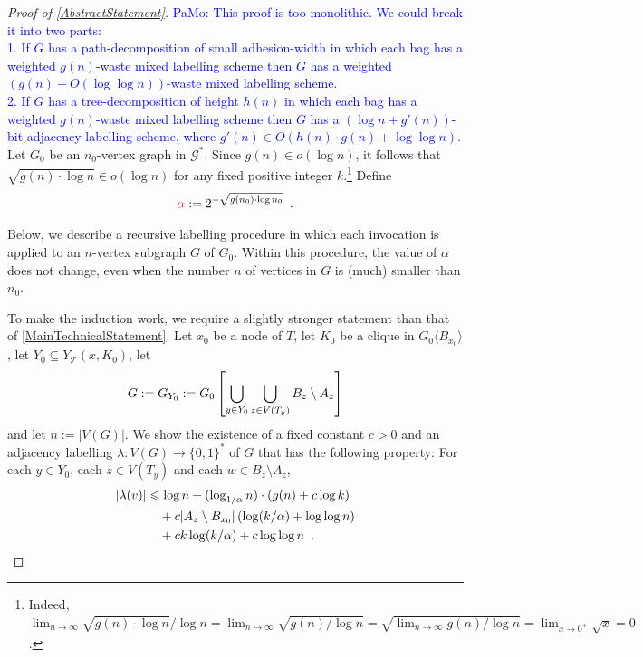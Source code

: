 \documentclass{patmorin}
\makeatletter
\newcommand{\torso}[2]{{#1}\langle{#2}\rangle}
\renewcommand{\le}{\leqslant}
\newcommand{\pat}[1]{\textcolor{Blue}{PaMo: #1}}
\def\mathcolor#1#{\@mathcolor{#1}}
\def\@mathcolor#1#2#3{%
  \protect\leavevmode
  \begingroup
    \color#1{#2}#3%
  \endgroup
}
\newcommand{\mathdefin}[1]{\mathcolor{brightmaroon}{#1}}
\makeatother
\begin{document}
  \begin{proof}[Proof of \cref{AbstractStatement}]
    \pat{This proof is too monolithic.  We could break it into two parts:\\[2ex]
    1. If $G$ has a path-decomposition of small adhesion-width in which each bag has a weighted $g(n)$-waste mixed labelling scheme then $G$ has a weighted $(g(n)+O(\log\log n))$-waste mixed labelling scheme.\\[2ex]
    2. If $G$ has a tree-decomposition of height $h(n)$ in which each bag has a weighted $g(n)$-waste mixed labelling scheme then $G$ has a $(\log n + g'(n))$-bit adjacency labelling scheme, where $g'(n)\in O(h(n)\cdot g(n)+\log\log n)$. \\[1ex]
    }
    Let $G_0$ be an $n_0$-vertex graph in $\mathcal{G}^*$.
    Since $g(n)\in o(\log n)$, it follows that $\sqrt{g(n)\cdot\log n}\in o(\log n)$ for any fixed positive integer $k$.\footnote{Indeed, $\lim_{n\to\infty}\sqrt{g(n)\cdot\log n}/\log n=\lim_{n\to\infty}\sqrt{g(n)/\log n}=\sqrt{\lim_{n\to\infty}g(n)/\log n}=\lim_{x\to 0^+}\sqrt{x}=0$.}
    Define
    \[
      \mathdefin{\alpha}:=2^{-\sqrt{g(n_0)\cdot\log n_0}} \enspace .
    \]


    Below, we describe a recursive labelling procedure in which each invocation is applied to an $n$-vertex subgraph $G$ of $G_0$.  Within this procedure, the value of $\alpha$ does not change, even when the number $n$ of vertices in $G$ is (much) smaller than $n_0$.

    To make the induction work, we require a slightly stronger statement than that of \cref{MainTechnicalStatement}.  Let $x_0$ be a node of $T$, let $K_0$ be a clique in $\torso{G_0}{B_{x_0}}$, let $Y_0\subseteq Y_\mathcal{T}(x,K_0)$, let
    \[
       G:=G_{Y_0}:=G_0\left[\bigcup_{y\in Y_0}\medskip \bigcup_{z\in V(T_y)} B_z\setminus A_z\right]
    \]
    and let $n:=|V(G)|$.
    We show the existence of a fixed constant $c>0$ and an adjacency labelling  $\lambda:V(G)\to\{0,1\}^*$ of $G$ that has the following property: For each $y\in Y_0$, each $z\in V(T_y)$ and each $w\in B_z\setminus A_z$,
    \begin{align}
      |\lambda(v)|
      & \le \log n + (\log_{1/\alpha} n)\cdot (g(n)+c\log k) \notag \\
      & \quad {} + c|A_z\setminus B_{x_0}|\left(\log (k/\alpha) + \log\log n\right) \notag \\
      & \quad {} + ck\log(k/\alpha) + c\log\log n \enspace .\label{solution}
    \end{align}


\end{proof}
\end{document}
